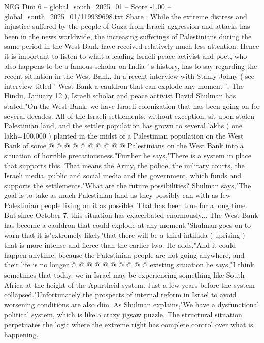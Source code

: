 \begin{textsample}{NEG Dim 6 – global\_south\_2025\_01 – Score -1.00 – global\_south\_2025\_01/119939698.txt}  \label{ex:f6_neg_017}
Share : While the extreme distress and injustice suffered by the people of Gaza from Israeli aggression and attacks has been in the news worldwide, the increasing sufferings of Palestinians during the same period in the West Bank have received relatively much less attention.
Hence it is important to listen to what a leading Israeli peace activist and poet, who also happens to be a famous scholar on India ' s history, has to say regarding the recent situation in the West Bank.
In a recent interview with Stanly Johny ( see interview titled ' West Bank a cauldron that can explode any moment ', The Hindu, January 12 ), Israeli scholar and peace activist David Shulman has stated,"On the West Bank, we have Israeli colonization that has been going on for several decades.
All of the Israeli settlements, without exception, sit upon stolen Palestinian land, and the settler population has grown to several lakhs ( one lakh=100,000 ) planted in the midst of a Palestinian population on the West Bank of some @ @ @ @ @ @ @ @ @ @ Palestinians on the West Bank into a situation of horrible precariousness."Further he says,"There is a system in place that supports this.
That means the Army, the police, the military courts, the Israeli media, public and social media and the government, which funds and supports the settlements."What are the future possibilities?
Shulman says,"The goal is to take as much Palestinian land as they possibly can with as few Palestinian people living on it as possible.
That has been true for a long time.
But since October 7, this situation has exacerbated enormously...
The West Bank has become a cauldron that could explode at any moment."Shulman goes on to warn that it is"extremely likely"that there will be a third intifada ( uprising ) that is more intense and fierce than the earlier two.
He adds,"And it could happen anytime, because the Palestinian people are not going anywhere, and their life is no longer @ @ @ @ @ @ @ @ @ @ existing situation he says,"I think sometimes that today, we in Israel may be experiencing something like South Africa at the height of the Apartheid system.
Just a few years before the system collapsed."Unfortunately the prospects of internal reform in Israel to avoid worsening conditions are also dim.
As Shulman explains,"We have a dysfunctional political system, which is like a crazy jigsaw puzzle.
The structural situation perpetuates the logic where the extreme right has complete control over what is happening.

\end{textsample}
